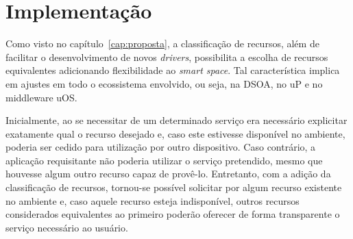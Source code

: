 \chapter{Implementação}

Como visto no capítulo~\ref{cap:proposta}, a classificação de recursos, além de facilitar o desenvolvimento de novos \emph{drivers}, possibilita a escolha de recursos equivalentes adicionando flexibilidade ao \emph{smart space}. Tal característica implica em ajustes em todo o ecossistema envolvido, ou seja, na DSOA, no uP e no middleware uOS.

Inicialmente, ao se necessitar de um determinado serviço era necessário explicitar exatamente qual o recurso desejado e, caso este estivesse disponível no ambiente, poderia ser cedido para utilização por outro dispositivo. Caso contrário, a aplicação requisitante não poderia utilizar o serviço pretendido, mesmo que houvesse algum outro recurso capaz de provê-lo. Entretanto, com a adição da classificação de recursos, tornou-se possível solicitar por algum recurso existente no ambiente e, caso aquele recurso esteja indisponível, outros recursos considerados equivalentes ao primeiro poderão oferecer de forma transparente o serviço necessário ao usuário.



